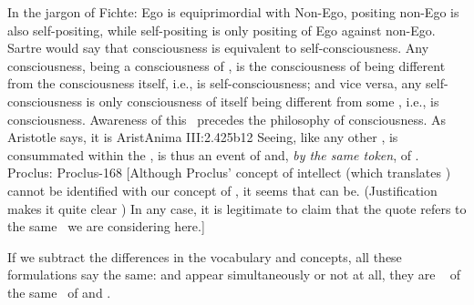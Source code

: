 In the jargon of Fichte: Ego is equiprimordial with Non-Ego, positing non-Ego is
also self-positing, while self-positing is only positing of Ego against non-Ego.
Sartre would say that consciousness is equivalent to self-consciousness. Any
consciousness, being a consciousness of \thi{\ldots}, is the consciousness of
\thi{\ldots} being different from the consciousness itself, i.e., is
self-consciousness; and vice versa, any self-consciousness is only consciousness
of itself being different from some \thi{\ldots}, i.e., is
consciousness.
%
Awareness of this \equin\ precedes the philosophy of consciousness.  As
Aristotle says, it is \citet{by sight that one perceives that one
  sees.}{AristAnima}{ III:2.425b12} Seeing, like any other , is
consummated within the \hoa, is thus an event of  and, {\em
  by the same token}, of . Proclus: \citet{Every intellect
  apprehends itself. [...]  Every intellect in its act knows that it apprehends.
  Intellect whose feature is to apprehend is not different from that which
  apprehends that it apprehends.}{Proclus}{\para{}-168 [Although Proclus'
  concept of intellect (which translates ) cannot be identified with
  our concept of , it seems that  can be.
  (Justification makes it quite clear )  In any case, it is legitimate to claim that the quote refers to the
  same \equin\ we are considering here.]}


If we subtract the differences in the vocabulary
and concepts, all these formulations say the same:  and
 appear simultaneously or not at all, they are \equi\
 of the same \nexus\ of  and . 

